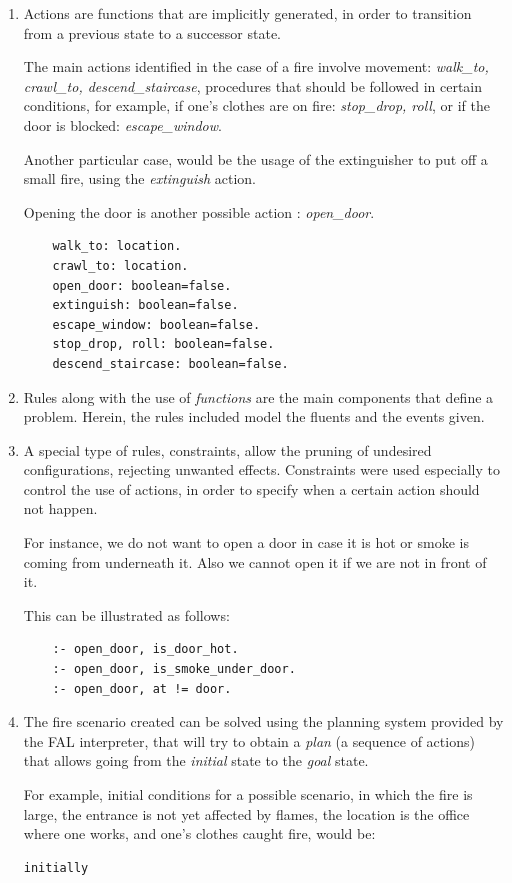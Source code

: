 \documentclass[a4paper,12pt]{report}
\begin{document}
\begin{enumerate}
\item {\color{Red} Actions} are functions that are implicitly generated, in order to transition from a previous state to a successor state.

The main actions identified in the case of a fire involve movement: {\it walk\_to, crawl\_to, descend\_staircase}, procedures that should be followed in certain conditions, for example, if one's clothes are on fire: {\it stop\_drop, roll}, or if the door is blocked: {\it escape\_window}.

 Another particular case, would be the usage of the extinguisher to put off a small fire, using the {\it extinguish} action.

Opening the door is another possible action : {\it open\_door}.

\begin{verbatim}
	walk_to: location.
	crawl_to: location.
	open_door: boolean=false.
	extinguish: boolean=false.
	escape_window: boolean=false.
	stop_drop, roll: boolean=false.
	descend_staircase: boolean=false.
\end{verbatim}

\item {\color{Red} Rules} along with the use of {\it functions} are the main components that define a problem. 
Herein, the rules included model the fluents and the events given.

\item A special type of rules, {\color{Red} constraints}, allow the pruning of undesired configurations, rejecting unwanted effects.
Constraints were used especially to control the use of actions, in order to specify when a certain action should not happen.

For instance, we do not want to open a door in case it is hot or smoke is coming from underneath it.
Also we cannot open it if we are not in front of it.

This can be illustrated as follows:
\begin{verbatim} 
	:- open_door, is_door_hot.
	:- open_door, is_smoke_under_door.
	:- open_door, at != door.
\end{verbatim}


\item The fire scenario created can be solved using the {\color {Red} planning} system provided by the FAL interpreter, that will try to obtain a {\it plan} (a sequence of actions) that allows going from the {\it initial} state to the {\it goal} state.

For example, initial conditions for a possible scenario, in which the fire is large, the entrance is not yet affected by flames, the location is the office where one works, and one's clothes caught fire,  would be:
\begin{verbatim}
initially


\end{verbatim}
\end{enumerate}
\end{document}
